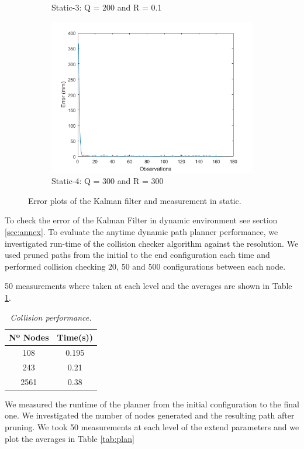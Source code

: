 \begin{figure}[ht!]
\begin{subfigure}{.5\textwidth}
  \caption{Static-3: Q = 200 and R = 0.1}
  \label{fig:sfig3}
\end{subfigure}
\begin{subfigure}{.5\textwidth}
  \centering
  \includegraphics[width=.8\linewidth]{Images/kalman_plots/static_4.png}
  \caption{Static-4: Q = 300 and R = 300}
  \label{fig:sfig4}
\end{subfigure}
\caption{Error plots of the Kalman filter and measurement in static.}
\label{fig:static_kalman}
\end{figure}

To check the error of the Kalman Filter in dynamic environment see section \ref{sec:annex}.
\newpage
To evaluate the anytime dynamic path planner performance, we investigated run-time of the collision checker algorithm against the resolution. We used pruned paths from the initial to the end configuration each time and performed collision checking 20, 50 and 500 configurations between each node.

50 measurements where taken at each level and the averages are shown in Table \ref{tab:coll}.
\begin{table}[ht!
]
\centering
\label{plan:accuracy_table}
    \begin{tabular}{|c|c|}
    \hline
    Nº Nodes & Time(s))  \\ \hline
      108       &  0.195     \\ \hline
      243      & 0.21      \\ \hline
        2561      &  0.38       \\ \hline
    \end{tabular}
    \caption[]{\textit{ Collision performance.}}
    \label{tab:coll}
\end{table}

We measured the runtime of the planner from the initial configuration to the final one. We investigated the number of nodes generated and the resulting path after pruning. We took 50 measurements at each level of the extend parameters and we plot the averages in Table \ref{tab:plan}

